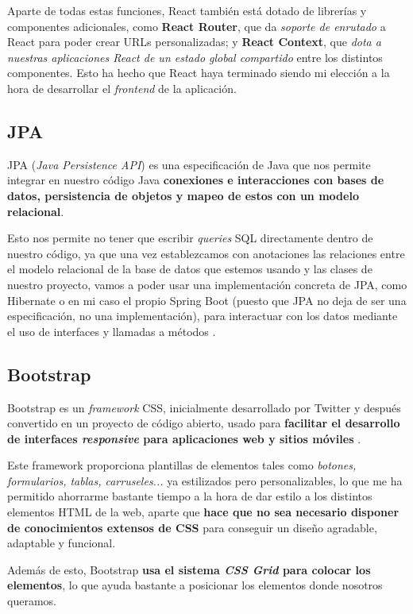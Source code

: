 Aparte de todas estas funciones, React también está dotado de librerías y componentes adicionales, como \textbf{React Router}, que da \textit{soporte de enrutado} a React para poder crear URLs personalizadas; y \textbf{React Context}, que \textit{dota a nuestras aplicaciones React de un estado global compartido} entre los distintos componentes. Esto ha hecho que React haya terminado siendo mi elección a la hora de desarrollar el \textit{frontend} de la aplicación.

\subsection{JPA}

JPA (\textit{Java Persistence API}) es una especificación de Java que nos permite integrar en nuestro código Java \textbf{conexiones e interacciones con bases de datos, persistencia de objetos y mapeo de estos con un modelo relacional}.

Esto nos permite no tener que escribir \textit{queries} SQL directamente dentro de nuestro código, ya que una vez establezcamos con anotaciones las relaciones entre el modelo relacional de la base de datos que estemos usando y las clases de nuestro proyecto, vamos a poder usar una implementación concreta de JPA, como  Hibernate o en mi caso el propio Spring Boot (puesto que JPA no deja de ser una especificación, no una implementación), para interactuar con los datos mediante el uso de interfaces y llamadas a métodos \cite{campusmvp:jpa}.


\subsection{Bootstrap}

Bootstrap es un \textit{framework} CSS, inicialmente desarrollado por Twitter y después convertido en un proyecto de código abierto, usado para \textbf{facilitar el desarrollo de interfaces \textit{responsive} para aplicaciones web y sitios móviles} \cite{w3schools:bootstrap}.

Este framework proporciona plantillas de elementos tales como \textit{botones, formularios, tablas, carruseles...} ya estilizados pero personalizables, lo que me ha permitido ahorrarme bastante tiempo a la hora de dar estilo a los distintos elementos HTML de la web, aparte que \textbf{hace que no sea necesario disponer de conocimientos extensos de CSS} para conseguir un diseño agradable, adaptable y funcional.

Además de esto, Bootstrap \textbf{usa el sistema \textit{CSS Grid} para colocar los elementos}, lo que ayuda bastante a posicionar los elementos donde nosotros queramos.

